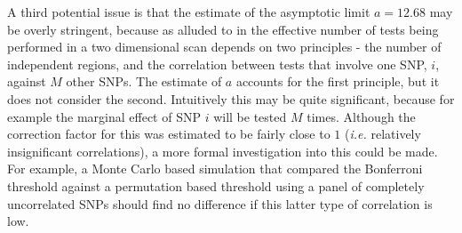 A third potential issue is that the estimate of the asymptotic limit $a=12.68$ may be overly stringent, because as alluded to in \citet{Becker2011} the effective number of tests being performed in a two dimensional scan depends on two principles - the number of independent regions, and the correlation between tests that involve one SNP, $i$, against $M$ other SNPs. The estimate of $a$ accounts for the first principle, but it does not consider the second. Intuitively this may be quite significant, because for example the marginal effect of SNP $i$ will be tested $M$ times. Although the correction factor for this was estimated to be fairly close to $1$ (\emph{i.e.} relatively insignificant correlations), a more formal investigation into this could be made. For example, a Monte Carlo based simulation that compared the Bonferroni threshold against a permutation based threshold using a panel of completely uncorrelated SNPs should find no difference if this latter type of correlation is low.

